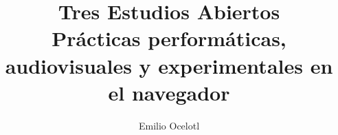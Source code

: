 \documentclass[10pt,letterpaper, twocolumn]{article}
\title{%
  Tres Estudios Abiertos \\
  \large Prácticas performáticas, audiovisuales y experimentales en el navegador}
\author{Emilio Ocelotl}
\begin{document}
\maketitle

\begin{abstract}

\end{abstract}

 


\end{document}
